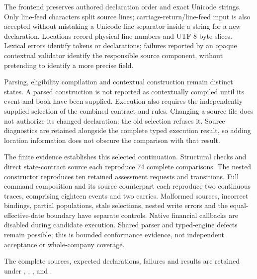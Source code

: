 The frontend preserves authored declaration order and exact Unicode strings.
Only line-feed characters split source lines; carriage-return/line-feed input
is also accepted without mistaking a Unicode line separator inside a string
for a new declaration. Locations record physical line numbers and UTF-8 byte
slices. Lexical errors identify tokens or declarations; failures reported by
an opaque contextual validator identify the responsible source component,
without pretending to identify a more precise field.

Parsing, eligibility compilation and contextual construction remain distinct
states. A parsed construction is not reported as contextually compiled until
its event and book have been supplied. Execution also requires the independently
supplied selection of the combined contract and rules. Changing a source file
does not authorize its changed declaration: the old selection refuses it.
Source diagnostics are retained alongside the complete typed execution result,
so adding location information does not obscure the comparison with that result.

The finite evidence establishes this selected continuation. Structural checks
and direct state-contract source each reproduce 74 complete comparisons. The
nested constructor reproduces ten retained assessment requests and transitions.
Full command composition and its source counterpart each reproduce two
continuous traces, comprising eighteen events and two carries. Malformed
sources, incorrect bindings, partial populations, stale selections, nested
write errors and the equal-effective-date boundary have separate controls.
Native financial callbacks are disabled during candidate execution. Shared
parser and typed-engine defects remain possible; this is bounded conformance
evidence, not independent acceptance or whole-company coverage.

The complete sources, expected declarations, failures and results are retained
under ,
,
,
 and
.
